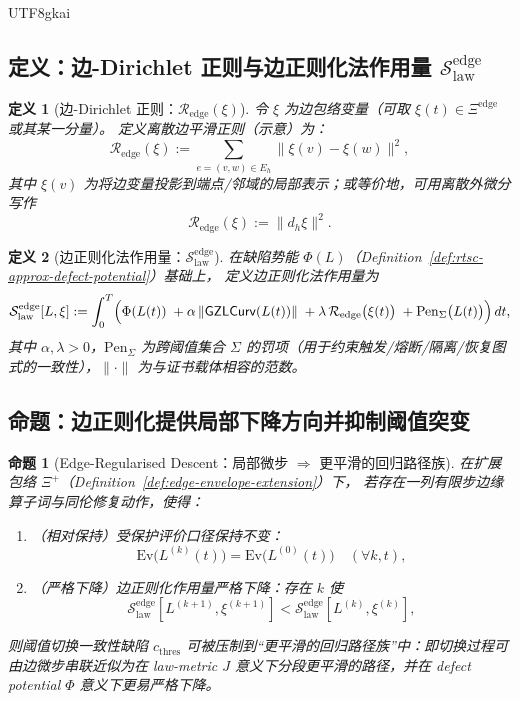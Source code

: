 \documentclass[12pt]{article}
\newtheorem{definition}{定义}[section]
\newtheorem{proposition}{命题}[section]
\newcommand{\GZLCurv}{\ensuremath{\mathsf{GZLCurv}}}
\begin{document}
\begin{CJK*}{UTF8}{gkai}
\subsection{定义：边-Dirichlet 正则与边正则化法作用量 $\mathcal{S}_{\mathrm{law}}^{\mathrm{edge}}$}

\begin{definition}[边-Dirichlet 正则：$\mathcal{R}_{\mathrm{edge}}(\xi)$]
\label{def:edge-dirichlet-regularizer}
令 $\xi$ 为边包络变量（可取 $\xi(t)\in\Xi^{\mathrm{edge}}$ 或其某一分量）。
定义离散边平滑正则（示意）为：
\[
\mathcal{R}_{\mathrm{edge}}(\xi)
:=
\sum_{e=(v,w)\in E_h}\|\xi(v)-\xi(w)\|^2,
\]
其中 $\xi(v)$ 为将边变量投影到端点/邻域的局部表示；或等价地，可用离散外微分写作
\[
\mathcal{R}_{\mathrm{edge}}(\xi):=\|d_h\xi\|^2.
\]
\end{definition}

\begin{definition}[边正则化法作用量：$\mathcal{S}_{\mathrm{law}}^{\mathrm{edge}}$]
\label{def:edge-regularised-law-action}
在缺陷势能 $\Phi(L)$（Definition~\ref{def:rtsc-approx-defect-potential}）基础上，
定义边正则化法作用量为
\[
\mathcal{S}_{\mathrm{law}}^{\mathrm{edge}}[L,\xi]
:=
\int_0^T
\Bigl(
\Phi(L(t))
\;+\alpha\,\|\GZLCurv(L(t))\|
\;+\lambda\,\mathcal{R}_{\mathrm{edge}}\bigl(\xi(t)\bigr)
\;+\mathrm{Pen}_{\Sigma}\bigl(L(t)\bigr)
\Bigr)\,dt,
\]
其中 $\alpha,\lambda>0$，$\mathrm{Pen}_{\Sigma}$ 为跨阈值集合 $\Sigma$ 的罚项（用于约束触发/熔断/隔离/恢复图式的一致性），$\|\cdot\|$ 为与证书载体相容的范数。
\end{definition}

\subsection{命题：边正则化提供局部下降方向并抑制阈值突变}

\begin{proposition}[Edge-Regularised Descent：局部微步 $\Rightarrow$ 更平滑的回归路径族]
\label{prop:edge-regularised-descent}
在扩展包络 $\Xi^{+}$（Definition~\ref{def:edge-envelope-extension}）下，
若存在一列有限步边缘算子词与同伦修复动作，使得：
\begin{enumerate}
  \item（相对保持）受保护评价口径保持不变：
  \[
  \mathrm{Ev}\bigl(L^{(k)}(t)\bigr)=\mathrm{Ev}\bigl(L^{(0)}(t)\bigr)\quad(\forall k,t),
  \]
  \item（严格下降）边正则化作用量严格下降：存在 $k$ 使
  \[
  \mathcal{S}_{\mathrm{law}}^{\mathrm{edge}}[L^{(k+1)},\xi^{(k+1)}]
  <
  \mathcal{S}_{\mathrm{law}}^{\mathrm{edge}}[L^{(k)},\xi^{(k)}],
  \]
\end{enumerate}
则阈值切换一致性缺陷 $c_{\mathrm{thres}}$ 可被压制到“更平滑的回归路径族”中：即切换过程可由边微步串联近似为在 law-metric $J$ 意义下分段更平滑的路径，并在 defect potential $\Phi$
  意义下更易严格下降。
\end{proposition}


\end{CJK*}
\end{document}
